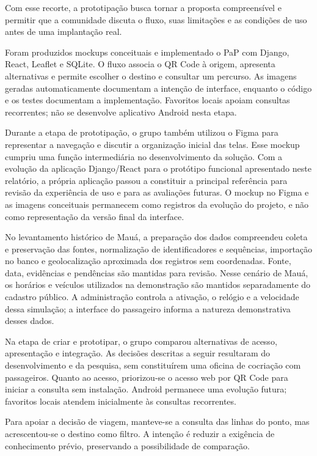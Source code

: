 \documentclass[12pt,oneside,a4paper,brazil,chapter=TITLE]{abntex2}
\begin{document}
Com esse recorte, a prototipação busca tornar a proposta compreensível e permitir que a comunidade discuta o fluxo, suas limitações e as condições de uso antes de uma implantação real.

Foram produzidos mockups conceituais e implementado o PaP com Django, React, Leaflet e SQLite. O fluxo associa o QR Code à origem, apresenta alternativas e permite escolher o destino e consultar um percurso. As imagens geradas automaticamente documentam a intenção de interface, enquanto o código e os testes documentam a implementação. Favoritos locais apoiam consultas recorrentes; não se desenvolve aplicativo Android nesta etapa.

Durante a etapa de prototipação, o grupo também utilizou o Figma para representar a navegação e discutir a organização inicial das telas. Esse mockup cumpriu uma função intermediária no desenvolvimento da solução. Com a evolução da aplicação Django/React para o protótipo funcional apresentado neste relatório, a própria aplicação passou a constituir a principal referência para revisão da experiência de uso e para as avaliações futuras. O mockup no Figma e as imagens conceituais permanecem como registros da evolução do projeto, e não como representação da versão final da interface.

No levantamento histórico de Mauá, a preparação dos dados compreendeu coleta e preservação das fontes, normalização de identificadores e sequências, importação no banco e geolocalização aproximada dos registros sem coordenadas. Fonte, data, evidências e pendências são mantidas para revisão. Nesse cenário de Mauá, os horários e veículos utilizados na demonstração são mantidos separadamente do cadastro público. A administração controla a ativação, o relógio e a velocidade dessa simulação; a interface do passageiro informa a natureza demonstrativa desses dados.

Na etapa de criar e prototipar, o grupo comparou alternativas de acesso, apresentação e integração. As decisões descritas a seguir resultaram do desenvolvimento e da pesquisa, sem constituírem uma oficina de cocriação com passageiros.
Quanto ao acesso, priorizou-se o acesso web por QR Code para iniciar a consulta sem instalação. Android permanece uma evolução futura; favoritos locais atendem inicialmente às consultas recorrentes.

Para apoiar a decisão de viagem, manteve-se a consulta das linhas do ponto, mas acrescentou-se o destino como filtro. A intenção é reduzir a exigência de conhecimento prévio, preservando a possibilidade de comparação.
\end{document}
